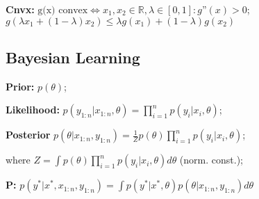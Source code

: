 \textbf{Cnvx:} \; $\text{g(x) convex} \Leftrightarrow x_1,x_2 \in \mathbb{R}, \lambda \in [0,1]: g\text{''}(x) > 0$; \\ 
\hfill $g(\lambda x_1 + (1-\lambda) x_2) \leq \lambda g(x_1) + (1-\lambda) g(x_2)$



\subsection*{Bayesian Learning} \;
\textbf{Prior:} \; $p(\theta)$;

\textbf{Likelihood:} \; $p(y_{1:n} | x_{1:n}, \theta) = \prod_{i=1}^{n} p(y_i | x_i, \theta)$;

\textbf{Posterior} \; $p(\theta | x_{1:n}, y_{1:n}) = \frac{1}{Z} p(\theta) \prod_{i=1}^{n} p(y_i | x_i, \theta)$;

where $Z = \int p(\theta) \prod_{i=1}^{n} p(y_i | x_i, \theta) d\theta$ (norm. const.);

\textbf{P:} \; $p(y^* | x^*, x_{1:n}, y_{1:n}) = \int p(y^* | x^*, \theta) p(\theta | x_{1:n}, y_{1:n}) d\theta$
